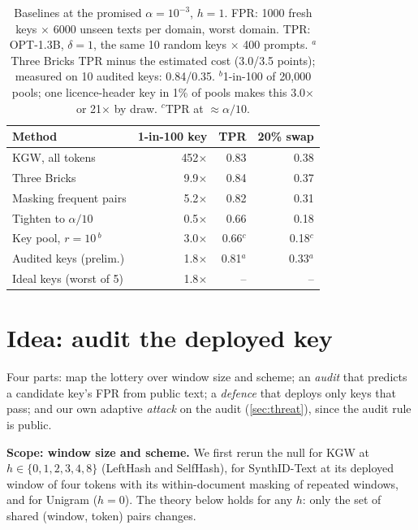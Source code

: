 \documentclass{article}
\theoremstyle{plain}
\begin{document}
\begin{table}[t]
  \caption{Baselines at the promised $\alpha=10^{-3}$, $h=1$. FPR: 1000 fresh keys $\times$ 6000 unseen texts per domain, worst domain. TPR: OPT-1.3B, $\delta=1$, the same 10 random keys $\times$ 400 prompts. $^a$Three Bricks TPR minus the estimated cost (3.0/3.5 points); measured on 10 audited keys: 0.84/0.35. $^b$1-in-100 of 20{,}000 pools; one licence-header key in 1\% of pools makes this 3.0$\times$ or 21$\times$ by draw. $^c$TPR at ${\approx}\alpha/10$.}
  \label{tab:baselines}
  \vskip 0.05in
  \centering
  \small
  \begin{tabular}{lrrr}
    \toprule
    Method & 1-in-100 key & TPR & 20\% swap \\
    \midrule
    KGW, all tokens & 452$\times$ & 0.83 & 0.38 \\
    Three Bricks & 9.9$\times$ & 0.84 & 0.37 \\
    Masking frequent pairs & 5.2$\times$ & 0.82 & 0.31 \\
    Tighten to $\alpha/10$ & 0.5$\times$ & 0.66 & 0.18 \\
    Key pool, $r=10$\,$^b$ & 3.0$\times$ & 0.66$^c$ & 0.18$^c$ \\
    \midrule
    Audited keys (prelim.) & 1.8$\times$ & 0.81$^a$ & 0.33$^a$ \\
    Ideal keys (worst of 5) & 1.8$\times$ & -- & -- \\
    \bottomrule
  \end{tabular}
  \vspace{-3mm}
\end{table}

\section{Idea: audit the deployed key}
\label{sec:idea}

Four parts: map the lottery over window size and scheme; an \emph{audit} that predicts a candidate key's FPR from public text; a \emph{defence} that deploys only keys that pass; and our own adaptive \emph{attack} on the audit (\cref{sec:threat}), since the audit rule is public.

\textbf{Scope: window size and scheme.} We first rerun the null for KGW at $h\in\{0,1,2,3,4,8\}$ (LeftHash and SelfHash), for SynthID-Text at its deployed window of four tokens with its within-document masking of repeated windows, and for Unigram ($h=0$). The theory below holds for any $h$: only the set of shared (window, token) pairs changes.
\end{document}
